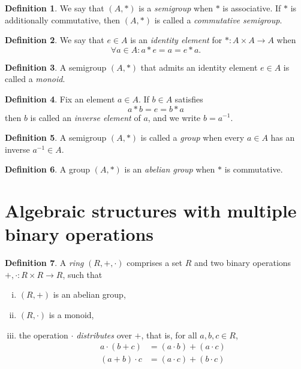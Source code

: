 \documentclass{article}
\theoremstyle{definition}
\newtheorem{definition}{Definition}
\begin{document}
\begin{definition}
	We say that $(A,*)$ is a \emph{semigroup} when $*$ is associative. If $*$ is additionally commutative, then $(A,*)$ is called a \emph{commutative semigroup}.
\end{definition}

\begin{definition}
	We say that $e\in A$ is an \emph{identity element} for $*:A\times A\to A$ when
	\[
		\forall a\in A : a*e = a = e*a.
	\]
\end{definition}

\begin{definition}
	A semigroup $(A,*)$ that admits an identity element $e\in A$ is called a \emph{monoid}.
\end{definition}

\begin{definition}
	Fix an element $a\in A$. If $b\in A$ satisfies
	\[
		a*b = e = b*a
	\]
	then $b$ is called an \emph{inverse element} of $a$, and we write $b=a^{-1}$.
\end{definition}

\begin{definition}
	A semigroup $(A,*)$ is called a \emph{group} when every $a\in A$ has an inverse $a^{-1}\in A$.
\end{definition}

\begin{definition}
	A group $(A,*)$ is an \emph{abelian group} when $*$ is commutative.
\end{definition}


\section*{Algebraic structures with multiple binary operations}

\begin{definition}
	A \emph{ring} $(R,+,\cdot)$ comprises a set $R$ and two binary operations $+,\cdot : R\times R\to R$, such that
	\begin{enumerate}[i.]
		\item $(R,+)$ is an abelian group,
		\item $(R,\cdot)$ is a monoid,
		\item the operation $\cdot$ \emph{distributes} over $+$, that is, for all $a,b,c\in R$,
			\begin{align*}
				a\cdot(b+c)	&=	(a\cdot b)+(a\cdot c)		\\
				(a+b)\cdot c	&=	(a\cdot c)+(b\cdot c)
			\end{align*}
	\end{enumerate}
\end{definition}
\end{document}
